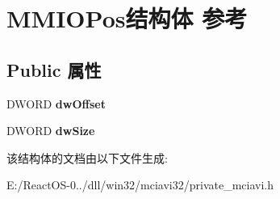 \hypertarget{struct_m_m_i_o_pos}{}\section{M\+M\+I\+O\+Pos结构体 参考}
\label{struct_m_m_i_o_pos}
\subsection*{Public 属性}
\begin{DoxyCompactItemize}
\item 
\mbox{\label{struct_m_m_i_o_pos_a8aefd078dbb1eb76d9d1b0c75b62339e}} 
D\+W\+O\+RD {\bfseries dw\+Offset}
\item 
\mbox{\label{struct_m_m_i_o_pos_a3ec8188d393829fd780172e97dd1f00f}} 
D\+W\+O\+RD {\bfseries dw\+Size}
\end{DoxyCompactItemize}


该结构体的文档由以下文件生成\+:\begin{DoxyCompactItemize}
\item 
E\+:/\+React\+O\+S-\/0../dll/win32/mciavi32/private\+\_\+mciavi.\+h\end{DoxyCompactItemize}
